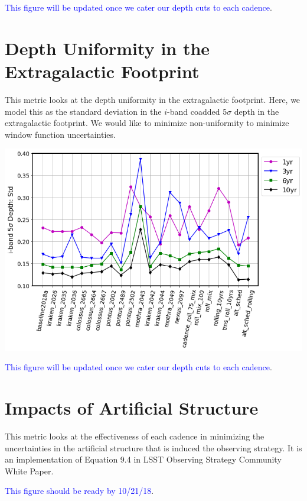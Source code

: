 \documentclass[a4paper,10pt]{article}
\newcommand{\clB}[1]{\textcolor{blue}{#1}}
\begin{document}
\clB{This figure will be updated once we cater our depth cuts to each cadence}.

\newpage
\section*{Depth Uniformity in the Extragalactic Footprint\label{depth std}}
This metric looks at the depth uniformity in the extragalactic footprint. Here, we model this as the standard deviation in the $i$-band coadded 5$\sigma$ depth in the extragalactic footprint.  We would like to minimize non-uniformity to minimize window function uncertainties. 

\begin{minipage}{\columnwidth}
\centering
 \includegraphics[width=.75\columnwidth]{lss_compare_depth_std_22dbs.png}
\end{minipage}

\clB{This figure will be updated once we cater our depth cuts to each cadence}.

\newpage 
\section*{Impacts of Artificial Structure\label{OS systematics}}
This metric looks at the effectiveness of each cadence in minimizing the uncertainties in the artificial structure that is induced the observing strategy. It is an implementation of Equation 9.4 in LSST Observing Strategy Community White Paper.

\clB{This figure should be ready by 10/21/18}.

\begin{minipage}{\columnwidth}
\centering
\end{minipage}
\end{document}
